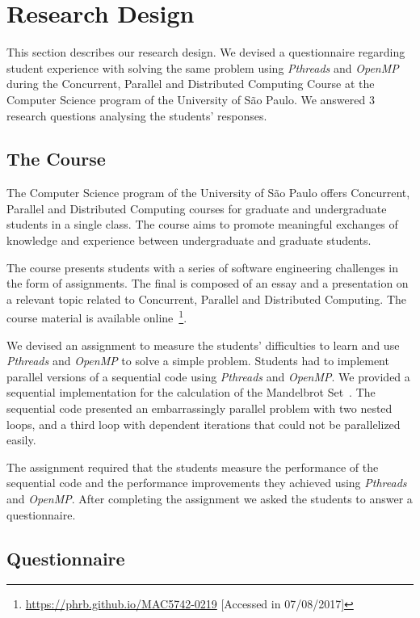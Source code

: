 \section{Research Design}
\label{sec:researchdesign}

This section describes our research design. We devised a questionnaire
regarding student experience with solving the same problem using
\textit{Pthreads} and \textit{OpenMP} during the Concurrent, Parallel and
Distributed Computing Course at the Computer Science program of the University
of São Paulo. We answered 3 research questions analysing the students'
responses.

\subsection{The Course}

The Computer Science program of the University of São Paulo offers Concurrent,
Parallel and Distributed Computing courses for graduate and undergraduate
students in a single class. The course aims to promote meaningful exchanges of
knowledge and experience between undergraduate and graduate students.

The course presents students with a series of software engineering challenges
in the form of assignments. The final is composed of an essay and a
presentation on a relevant topic related to Concurrent, Parallel and
Distributed Computing.  The course material is available
online~\footnote{\url{https://phrb.github.io/MAC5742-0219} [Accessed in
07/08/2017]}.

We devised an assignment to measure the students' difficulties to learn and use
\textit{Pthreads} and \textit{OpenMP} to solve a simple problem. Students had
to implement parallel versions of a sequential code using \textit{Pthreads} and
\textit{OpenMP}.  We provided a sequential implementation for the calculation
of the Mandelbrot Set~\cite{douady1984etude}. The sequential code presented an
embarrassingly parallel problem with two nested loops, and a third loop with
dependent iterations that could not be parallelized easily.

The assignment required that the students measure the performance of the
sequential code and the performance improvements they achieved using
\textit{Pthreads} and \textit{OpenMP}. After completing the assignment we asked
the students to answer a questionnaire.

\subsection{Questionnaire}

